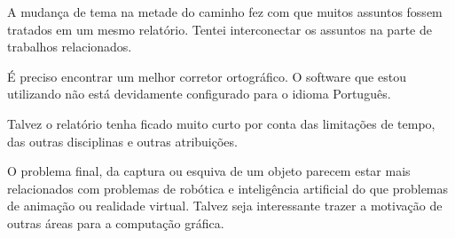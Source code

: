 \documentclass{article}
\begin{document}
A mudança de tema na metade do caminho fez com que muitos assuntos fossem tratados em um mesmo relatório. Tentei interconectar os assuntos na parte de trabalhos relacionados.

É preciso encontrar um melhor corretor ortográfico. O software que estou utilizando não está devidamente configurado para o idioma Português.

Talvez o relatório tenha ficado muito curto por conta das limitações de tempo, das outras disciplinas e outras atribuições.

O problema final, da captura ou esquiva de um objeto parecem estar mais relacionados com problemas de robótica e inteligência artificial do que problemas de animação ou realidade virtual. Talvez seja interessante trazer a motivação de outras áreas para a computação gráfica.


\end{document}
